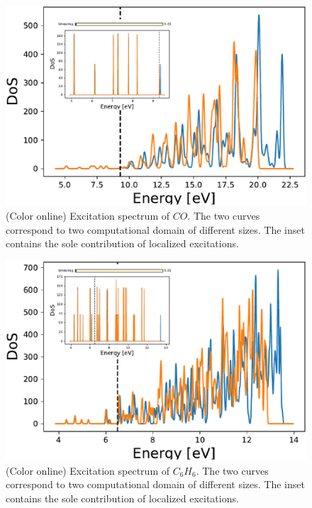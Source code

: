 \documentclass[reprint,aps,prb]{revtex4-1}
\begin{document}
\begin{figure}[ht]
\includegraphics[scale=0.24]{CO_exc.eps}
\caption{(Color online) Excitation spectrum of $CO$. The two curves correspond to two computational domain of different sizes. The inset contains the sole contribution of localized excitations.}
\label{CO_exc}
\end{figure}

\begin{figure}[ht]
\includegraphics[scale=0.24]{C6H6_exc.eps}
\caption{(Color online) Excitation spectrum of $C_6H_6$. The two curves correspond to two computational domain of different sizes. The inset contains the sole contribution of localized excitations.}
\label{C6H6_exc}
\end{figure}
\end{document}
